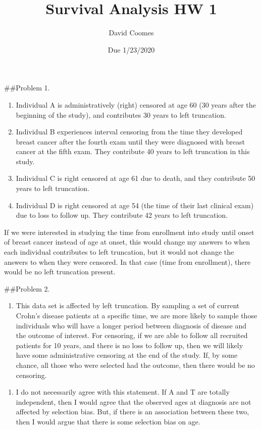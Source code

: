\documentclass[
]{article}
\title{Survival Analysis HW 1}
\author{David Coomes}
\date{Due 1/23/2020}
\providecommand{\tightlist}{%
  \setlength{\itemsep}{0pt}\setlength{\parskip}{0pt}}
\begin{document}
\maketitle

\#\#Problem 1.

\begin{enumerate}
\def\labelenumi{(\alph{enumi})}
\item
  Individual A is administratively (right) censored at age 60 (30 years
  after the beginning of the study), and contributes 30 years to left
  truncation.
\item
  Individual B experiences interval censoring from the time they
  developed breast cancer after the fourth exam until they were
  diagnosed with breast cancer at the fifth exam. They contribute 40
  years to left truncation in this study.
\item
  Individual C is right censored at age 61 due to death, and they
  contribute 50 years to left truncation.
\item
  Individual D is right censored at age 54 (the time of their last
  clinical exam) due to loss to follow up. They contribute 42 years to
  left truncation.
\end{enumerate}

If we were interested in studying the time from enrollment into study
until onset of breast cancer instead of age at onset, this would change
my answers to when each individual contributes to left truncation, but
it would not change the answers to when they were censored. In that case
(time from enrollment), there would be no left truncation present.

\#\#Problem 2.

\begin{enumerate}
\def\labelenumi{(\alph{enumi})}
\tightlist
\item
  This data set is affected by left truncation. By sampling a set of
  current Crohn's disease patients at a specific time, we are more
  likely to sample those individuals who will have a longer period
  between diagnosis of disease and the outcome of interest. For
  censoring, if we are able to follow all recruited patients for 10
  years, and there is no loss to follow up, then we will likely have
  some administrative censoring at the end of the study. If, by some
  chance, all those who were selected had the outcome, then there would
  be no censoring.
\end{enumerate}

\begin{enumerate}
\def\labelenumi{(\alph{enumi})}
\setcounter{enumi}{1}
\tightlist
\item
  I do not necessarily agree with this statement. If A and T are totally
  independent, then I would agree that the observed ages at diagnosis
  are not affected by selection bias. But, if there is an association
  between these two, then I would argue that there is some selection
  bias on age.
\end{enumerate}
\end{document}
